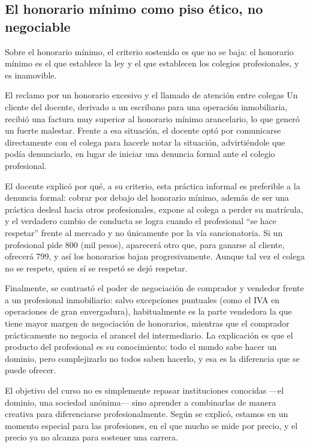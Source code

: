 \documentclass[12pt,oneside]{book}
\begin{document}
\subsection{El honorario mínimo como piso ético, no negociable}

Sobre el honorario mínimo, el criterio sostenido es que no se baja: el honorario mínimo es el que establece la ley y el que establecen los colegios profesionales, y es inamovible.

\begin{example}{El reclamo por un honorario excesivo y el llamado de atención entre colegas}
Un cliente del docente, derivado a un escribano para una operación inmobiliaria, recibió una factura muy superior al honorario mínimo arancelario, lo que generó un fuerte malestar. Frente a esa situación, el docente optó por comunicarse directamente con el colega para hacerle notar la situación, advirtiéndole que podía denunciarlo, en lugar de iniciar una denuncia formal ante el colegio profesional.

El docente explicó por qué, a su criterio, esta práctica informal es preferible a la denuncia formal: cobrar por debajo del honorario mínimo, además de ser una práctica desleal hacia otros profesionales, expone al colega a perder su matrícula, y el verdadero cambio de conducta se logra cuando el profesional ``se hace respetar'' frente al mercado y no únicamente por la vía sancionatoria. Si un profesional pide 800 (mil pesos), aparecerá otro que, para ganarse al cliente, ofrecerá 799, y así los honorarios bajan progresivamente. Aunque tal vez el colega no se respete, quien sí se respetó se dejó respetar.
\end{example}

Finalmente, se contrastó el poder de negociación de comprador y vendedor frente a un profesional inmobiliario: salvo excepciones puntuales (como el IVA en operaciones de gran envergadura), habitualmente es la parte vendedora la que tiene mayor margen de negociación de honorarios, mientras que el comprador prácticamente no negocia el arancel del intermediario. La explicación es que el producto del profesional es su conocimiento: todo el mundo sabe hacer un dominio, pero complejizarlo no todos saben hacerlo, y esa es la diferencia que se puede ofrecer.

\begin{important}
El objetivo del curso no es simplemente repasar instituciones conocidas ---el dominio, una sociedad anónima--- sino aprender a combinarlas de manera creativa para diferenciarse profesionalmente. Según se explicó, estamos en un momento especial para las profesiones, en el que mucho se mide por precio, y el precio ya no alcanza para sostener una carrera.
\end{important}
\end{document}
